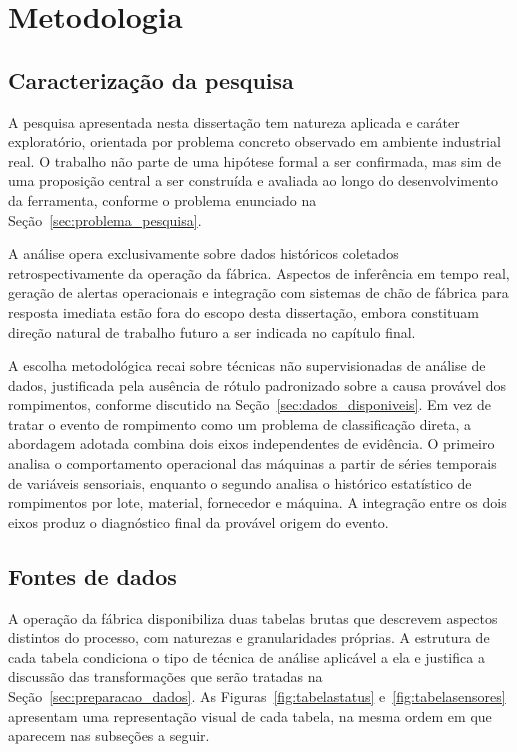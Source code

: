 \chapter{Metodologia}
\label{cap:metodologia}


\section{Caracterização da pesquisa}
\label{sec:caracterizacao_pesquisa}

A pesquisa apresentada nesta dissertação tem natureza aplicada e caráter exploratório, orientada por problema concreto observado em ambiente industrial real. O trabalho não parte de uma hipótese formal a ser confirmada, mas sim de uma proposição central a ser construída e avaliada ao longo do desenvolvimento da ferramenta, conforme o problema enunciado na Seção~\ref{sec:problema_pesquisa}.

A análise opera exclusivamente sobre dados históricos coletados retrospectivamente da operação da fábrica. Aspectos de inferência em tempo real, geração de alertas operacionais e integração com sistemas de chão de fábrica para resposta imediata estão fora do escopo desta dissertação, embora constituam direção natural de trabalho futuro a ser indicada no capítulo final.

A escolha metodológica recai sobre técnicas não supervisionadas de análise de dados, justificada pela ausência de rótulo padronizado sobre a causa provável dos rompimentos, conforme discutido na Seção~\ref{sec:dados_disponiveis}. Em vez de tratar o evento de rompimento como um problema de classificação direta, a abordagem adotada combina dois eixos independentes de evidência. O primeiro analisa o comportamento operacional das máquinas a partir de séries temporais de variáveis sensoriais, enquanto o segundo analisa o histórico estatístico de rompimentos por lote, material, fornecedor e máquina. A integração entre os dois eixos produz o diagnóstico final da provável origem do evento.


\section{Fontes de dados}
\label{sec:fontes_dados}

A operação da fábrica disponibiliza duas tabelas brutas que descrevem aspectos distintos do processo, com naturezas e granularidades próprias. A estrutura de cada tabela condiciona o tipo de técnica de análise aplicável a ela e justifica a discussão das transformações que serão tratadas na Seção~\ref{sec:preparacao_dados}. As Figuras~\ref{fig:tabelastatus} e~\ref{fig:tabelasensores} apresentam uma representação visual de cada tabela, na mesma ordem em que aparecem nas subseções a seguir.

